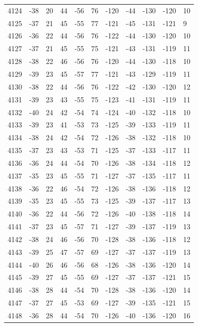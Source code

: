 \begin{table}[H]
\begin{tabular}{lllllllllll}
4124 & -38 & 20 & 44 & -56 & 76 & -120 & -44 & -130 & -120 & 10 \\
4125 & -37 & 21 & 45 & -55 & 77 & -121 & -45 & -131 & -121 & 9 \\
4126 & -36 & 22 & 44 & -56 & 76 & -122 & -44 & -130 & -120 & 10 \\
4127 & -37 & 21 & 45 & -55 & 75 & -121 & -43 & -131 & -119 & 11 \\
4128 & -38 & 22 & 46 & -56 & 76 & -120 & -44 & -130 & -118 & 10 \\
4129 & -39 & 23 & 45 & -57 & 77 & -121 & -43 & -129 & -119 & 11 \\
4130 & -38 & 22 & 44 & -56 & 76 & -122 & -42 & -130 & -120 & 12 \\
4131 & -39 & 23 & 43 & -55 & 75 & -123 & -41 & -131 & -119 & 11 \\
4132 & -40 & 24 & 42 & -54 & 74 & -124 & -40 & -132 & -118 & 10 \\
4133 & -39 & 23 & 41 & -53 & 73 & -125 & -39 & -133 & -119 & 11 \\
4134 & -38 & 24 & 42 & -54 & 72 & -126 & -38 & -132 & -118 & 10 \\
4135 & -37 & 23 & 43 & -53 & 71 & -125 & -37 & -133 & -117 & 11 \\
4136 & -36 & 24 & 44 & -54 & 70 & -126 & -38 & -134 & -118 & 12 \\
4137 & -35 & 23 & 45 & -55 & 71 & -127 & -37 & -135 & -117 & 11 \\
4138 & -36 & 22 & 46 & -54 & 72 & -126 & -38 & -136 & -118 & 12 \\
4139 & -35 & 23 & 45 & -55 & 73 & -125 & -39 & -137 & -117 & 13 \\
4140 & -36 & 22 & 44 & -56 & 72 & -126 & -40 & -138 & -118 & 14 \\
4141 & -37 & 23 & 45 & -57 & 71 & -127 & -39 & -137 & -119 & 13 \\
4142 & -38 & 24 & 46 & -56 & 70 & -128 & -38 & -136 & -118 & 12 \\
4143 & -39 & 25 & 47 & -57 & 69 & -127 & -37 & -137 & -119 & 13 \\
4144 & -40 & 26 & 46 & -56 & 68 & -126 & -38 & -136 & -120 & 14 \\
4145 & -39 & 27 & 45 & -55 & 69 & -127 & -37 & -137 & -121 & 15 \\
4146 & -38 & 28 & 44 & -54 & 70 & -128 & -38 & -136 & -120 & 14 \\
4147 & -37 & 27 & 45 & -53 & 69 & -127 & -39 & -135 & -121 & 15 \\
4148 & -36 & 28 & 44 & -54 & 70 & -126 & -40 & -136 & -120 & 16 \\

\end{tabular}
\end{table}
